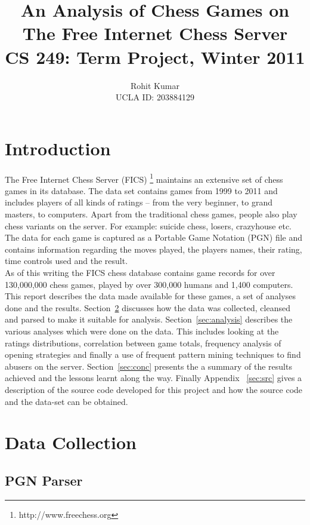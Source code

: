 \documentclass{article}
\author{Rohit Kumar \\UCLA ID: 203884129}
\title{An Analysis of Chess Games on The Free Internet Chess Server \\ CS 249: Term Project, Winter 2011}
\begin{document}
\maketitle


\section{Introduction}
\label{sec:intro}
The Free Internet Chess Server (FICS) \footnote{http://www.freechess.org} maintains an extensive set of chess games in its database. The data set contains games from 1999 to 2011 and includes players of all kinds of ratings -- from the very beginner, to grand masters, to computers. Apart from the traditional chess games, people also play chess variants on the server. For example: suicide chess, losers, crazyhouse etc. The data for each game is captured as a Portable Game Notation (PGN) \cite{wiki:pgn} file and contains information regarding the moves played, the players names, their rating, time controls used and the result. \\

As of this writing the FICS chess database contains game records for over 130,000,000 chess games, played by over 300,000 humans and 1,400 computers.\\

This report describes the data made available for these games, a set of analyses done and the results. Section~\ref{sec:datacol} discusses how the data was collected, cleansed and parsed to make it suitable for analysis. Section~\ref{sec:analysis} describes the various analyses which were done on the data. This includes looking at the ratings distributions, correlation between game totals, frequency analysis of opening strategies and finally a use of frequent pattern mining techniques to find abusers on the server. Section~\ref{sec:conc} presents the a summary of the results achieved and the lessons learnt along the way. Finally Appendix ~\ref{sec:src} gives a description of the source code developed for this project and how the source code and the data-set can be obtained.

\section{Data Collection}
\label{sec:datacol}

\subsection{PGN Parser}
\end{document}
